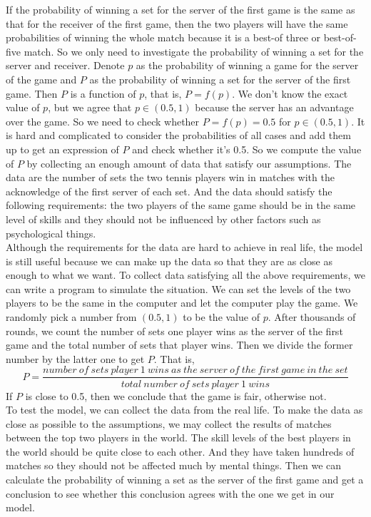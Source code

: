 \documentclass[12pt]{article}
\begin{document}
If the probability of winning a set for the server of the first game is the same as that for the receiver of the first game, then the two players will have the same probabilities of winning the whole match because it is a best-of three or best-of-five match. So we only need to investigate the probability of winning a set for the server and receiver. Denote $p$ as the probability of winning a game for the server of the game and $P$ as the probability of winning a set for the server of the first game. Then $P$ is a function of $p$, that is, $P = f(p)$. We don't know the exact value of $p$, but we agree that $p \in (0.5,1)$ because the server has an advantage over the game. So we need to check whether $P=f(p)=0.5$ for $p \in (0.5,1)$. It is hard and complicated to consider the probabilities of all cases and add them up to get an expression of $P$ and check whether it's 0.5. So we compute the value of $P$ by collecting an enough amount of data that satisfy our assumptions. The data are the number of sets the two tennis players win in matches with the acknowledge of the first server of each set. And the data should satisfy the following requirements: the two players of the same game should be in the same level of skills and they should not be influenced by other factors such as psychological things.\\

Although the requirements for the data are hard to achieve in real life, the model is still useful because we can make up the data so that they are as close as enough to what we want. To collect data satisfying all the above requirements, we can write a program to simulate the situation. We can set the levels of the two players to be the same in the computer and let the computer play the game. We randomly pick a number from $(0.5,1)$ to be the value of $p$. After thousands of rounds, we count the number of sets one player wins as the server of the first game and the total number of sets that player wins. Then we divide the former number by the latter one to get $P$. That is,
$$P=\frac{number~of~sets~player~1~wins~as~the~server~of~the~first~game~in~the~set}{total~number~of~sets~player~1~wins}$$
If $P$ is close to 0.5, then we conclude that the game is fair, otherwise not.\\

To test the model, we can collect the data from the real life. To make the data as close as possible to the assumptions, we may collect the results of matches between the top two players in the world. The skill levels of the best players in the world should be quite close to each other. And they have taken hundreds of matches so they should not be affected much by mental things. Then we can calculate the probability of winning a set as the server of the first game and get a conclusion to see whether this conclusion agrees with the one we get in our model.\\
 
\end{document}
